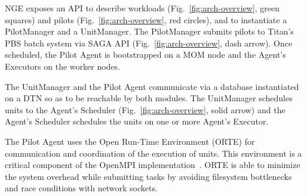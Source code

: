 NGE exposes an API to describe workloads (Fig.~\ref{fig:arch-overview}, green
squares) and pilots (Fig.~\ref{fig:arch-overview}, red circles), and to
instantiate a PilotManager and a UnitManager. The PilotManager submits pilots
to Titan's PBS batch system via SAGA API (Fig.~\ref{fig:arch-overview}, dash
arrow). %
Once scheduled, the Pilot Agent is bootstrapped on a MOM node and the
Agent's Executors on the worker nodes.

The UnitManager and the Pilot Agent communicate via a database instantiated on a
DTN so as to be reachable by both modules. The UnitManager schedules units to
the Agent's Scheduler (Fig.~\ref{fig:arch-overview}, solid arrow) and the
Agent's Scheduler schedules the units on one or more Agent's Executor.

The Pilot Agent uses the Open Run-Time Environment (ORTE) for communication and
coordination of the execution of units. This environment is a critical
component of the OpenMPI implementation~\cite{castain05:_open_rte}.
ORTE is able to minimize the system overhead while submitting tasks by
avoiding filesystem bottlenecks and race conditions with network sockets.